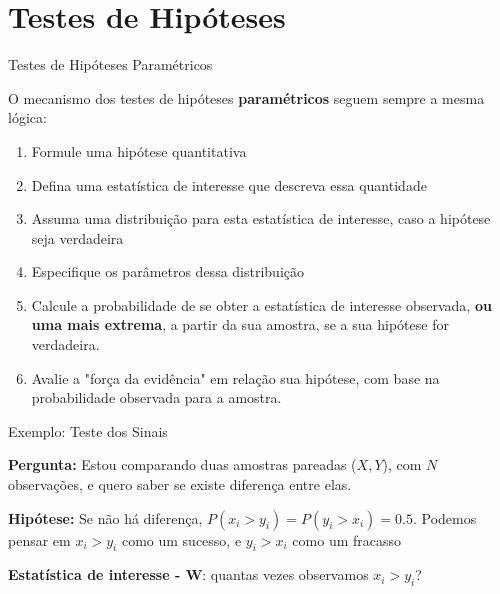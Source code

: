\documentclass{beamer}\usepackage[]{graphicx}\usepackage[]{color}
\begin{document}
\section{Testes de Hipóteses}


\begin{frame}{Testes de Hipóteses Paramétricos}

O mecanismo dos testes de hipóteses \textbf{paramétricos} seguem sempre a mesma lógica:
\vfill
  \begin{small}
  \begin{enumerate}
    \item Formule uma hipótese quantitativa \pause
    \item Defina uma estatística de interesse que descreva essa quantidade \pause
    \item Assuma uma distribuição para esta estatística de interesse, caso a hipótese seja verdadeira
    \item Especifique os parâmetros dessa distribuição \pause
    \item Calcule a probabilidade de se obter a estatística de interesse observada, \textbf{ou uma mais extrema}, a partir da sua amostra, se a sua hipótese for verdadeira. \pause
    \item Avalie a "força da evidência" em relação sua hipótese, com base na probabilidade observada para a amostra. \pause
  \end{enumerate}
  \end{small}
  
\end{frame} 

\begin{frame}{Exemplo: Teste dos Sinais}

\textbf{Pergunta:} Estou comparando duas amostras pareadas ($X,Y$), com $N$ observações, e quero saber se existe diferença entre elas.
\medskip

\textbf{Hipótese:} Se não há diferença, $P(x_i > y_i) = P(y_i > x_i) = 0.5$. Podemos pensar em $x_i > y_i$ como um sucesso, e $y_i > x_i$ como um fracasso
\medskip

\textbf{Estatística de interesse - W}: quantas vezes observamos $x_i > y_i$?
\medskip

\medskip



\end{frame} 
\end{document}
